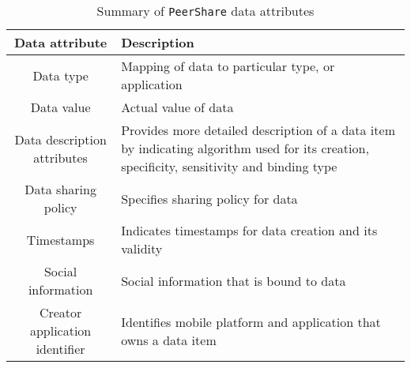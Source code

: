 \documentclass[twocolumn,a4paper,10pt]{article}
\newcommand{\peershare}{\texttt{PeerShare}\xspace}
\begin{document}
\begin{table*}[ht!]
\caption{Summary of \peershare data attributes}
\label{data_summary}
\centering
\begin{tabular}{| c | m{} |}
\hline
\textbf{Data attribute} & \textbf{Description} \\ \hline
Data type & Mapping of data to particular type, or application \\ \hline
Data value & Actual value of data \\ \hline
Data description attributes & Provides more detailed description of a data item by indicating algorithm used for its creation, specificity, sensitivity and binding type \\ \hline
Data sharing policy & Specifies sharing policy for data \\ \hline
Timestamps & Indicates timestamps for data creation and its validity\\ \hline
Social information & Social information that is bound to data \\ \hline
Creator application identifier & Identifies mobile platform and application that owns a data item \\ \hline
\end{tabular}
\end{table*}
\end{document}
